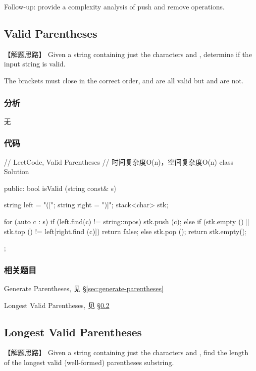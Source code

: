 Follow-up: provide a complexity analysis of push and remove operations.


\subsection{Valid Parentheses} %
\label{sec:valid-parentheses}


【解题思路】
Given a string containing just the characters \code{'(', ')', '\{', '\}', '['} and \code{']'}, determine if the input string is valid.

The brackets must close in the correct order,  and  are all valid but \code{"(]"} and  are not.


\subsubsection{分析}
无


\subsubsection{代码}
\begin{Code}
	// LeetCode, Valid Parentheses
	// 时间复杂度O(n)，空间复杂度O(n)
	class Solution {
		public:
		bool isValid (string const& s) {
			string left = "([{";
				string right = ")]}";
			stack<char> stk;
			
			for (auto c : s) {
				if (left.find(c) != string::npos) {
					stk.push (c);
				} else {
				if (stk.empty () || stk.top () != left[right.find (c)])
				return false;
				else
				stk.pop ();
			}
		}
		return stk.empty();
	}
};
\end{Code}


\subsubsection{相关题目}
\begindot
\item Generate Parentheses, 见 \S \ref{sec:generate-parentheses}
\item Longest Valid Parentheses, 见 \S \ref{sec:longest-valid-parentheses}
\myenddot


\subsection{Longest Valid Parentheses} %
\label{sec:longest-valid-parentheses}


【解题思路】
Given a string containing just the characters  and , find the length of the longest valid (well-formed) parentheses substring.

